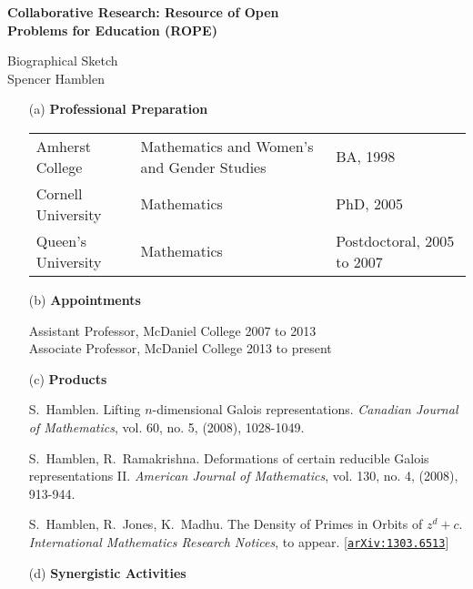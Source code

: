 \documentclass[11pt]{article}
\begin{document}
\begin{center}
{\Large \textbf{Collaborative Research: Resource of Open\\
Problems for Education (ROPE)}}

\bigskip

{\Large Biographical Sketch}\\
\smallskip
Spencer Hamblen
\end{center}

\begin{enumerate}[leftmargin=*]

\item[(a)] \textbf{Professional Preparation}

\begin{tabularx}{6.4in}{XXX}
Amherst College  & Mathematics and Women's and Gender Studies & \hfill BA, 1998\\
Cornell University & Mathematics & \hfill PhD, 2005 \\
Queen's University & Mathematics & \hfill Postdoctoral, 2005 to 2007\\
\end{tabularx}

\item[(b)] \textbf{Appointments}

Assistant Professor, McDaniel College  \hfill 2007 to 2013\\
Associate Professor, McDaniel College  \hfill 2013 to present\\



\item[(c)] \textbf{Products}


S.~Hamblen.  Lifting $n$-dimensional Galois representations. {\em Canadian Journal of Mathematics}, vol. 60, no. 5, (2008), 1028-1049.

\smallskip

S.~Hamblen, R.~Ramakrishna.  Deformations of certain reducible Galois representations II. {\em American Journal of Mathematics}, vol. 130, no. 4, (2008), 913-944.

\smallskip

S.~Hamblen, R.~Jones, K.~Madhu. The Density of Primes in Orbits of $z^d + c$.  {\em International Mathematics Research Notices}, to appear.  [\href{http://arxiv.org/abs/1303.6513}{\texttt{arXiv:1303.6513}}]


 
\item[(d)] \textbf{Synergistic Activities}


\end{enumerate}
\end{document}
